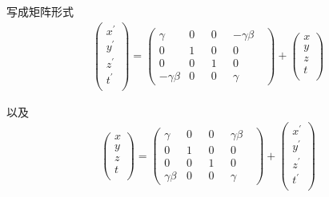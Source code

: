 \documentclass[12pt,a4paper]{article}
\begin{document}
写成矩阵形式
\begin{eqnarray*}
\begin{pmatrix}
x^{\prime} \\ y^{\prime}  \\ z^{\prime}  \\ t^{\prime} \\
\end{pmatrix} = 
\begin{pmatrix}
\gamma ~~~& 0 ~~~& 0 ~~~& -\gamma \beta ~~~\\
0 & 1 & 0 & 0 \\
0 & 0 & 1 & 0 \\
-\gamma \beta & 0 & 0 & \gamma
\end{pmatrix} + 
\begin{pmatrix}
x \\ y  \\ z  \\ t \\
\end{pmatrix}
\end{eqnarray*}

以及
\begin{eqnarray*}
\begin{pmatrix}
x \\ y  \\ z  \\ t \\
\end{pmatrix} = 
\begin{pmatrix}
\gamma ~~~& 0 ~~~& 0 ~~~& \gamma \beta ~~~\\
0 & 1 & 0 & 0 \\
0 & 0 & 1 & 0 \\
\gamma \beta & 0 & 0 & \gamma
\end{pmatrix} + 
\begin{pmatrix}
x^{\prime} \\ y^{\prime}  \\ z^{\prime}  \\ t^{\prime} \\
\end{pmatrix}
\end{eqnarray*}
\end{document}
